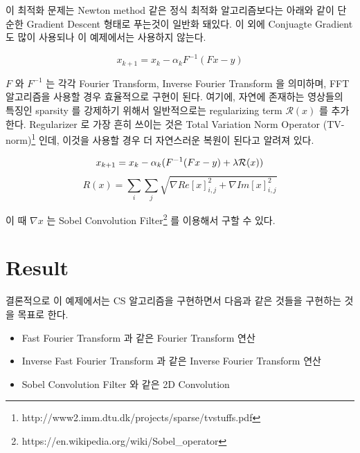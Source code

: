 \documentclass[twoside]{article}
\begin{document}
이 최적화 문제는 Newton method 같은 정식 최적화 알고리즘보다는 아래와 같이 단순한 Gradient Descent 형태로 푸는것이 일반화 돼있다. 이 외에 Conjuagte Gradient 도 많이 사용되나 이 예제에서는 사용하지 않는다.

\begin{equation}
  x_{k+1} = x_k - \alpha_k F^{-1} (Fx - y)
\end{equation}

$F$ 와 $F^{-1}$ 는 각각 Fourier Transform, Inverse Fourier Transform 을 의미하며, FFT 알고리즘을 사용할 경우 효율적으로 구현이 된다.
여기에, 자연에 존재하는 영상들의 특징인 sparsity 를 강제하기 위해서 일반적으로는 regularizing term $\mathcal{R}(x)$ 를 추가한다.
Regularizer 로 가장 흔히 쓰이는 것은 Total Variation Norm Operator (TV-norm)\footnote{http://www2.imm.dtu.dk/projects/sparse/tvstuffs.pdf} 인데, 이것을 사용할 경우 더 자연스러운 복원이 된다고 알려져 있다.

\begin{equation}
  x_{k+1} = x_k - \alpha_k (F^{-1} (Fx - y) + \lambda \mathcal{R}(x)) \\
\end{equation}
\begin{equation}
  R(x) = \sum_i \sum_j \sqrt{ \nabla Re{[x]}_{i,j}^2 + \nabla Im{[x]}_{i,j} ^2}
\end{equation}

이 때 $\nabla x$ 는 Sobel Convolution Filter\footnote{https://en.wikipedia.org/wiki/Sobel\_operator} 를 이용해서 구할 수 있다.

\section{Result}

결론적으로 이 예제에서는 CS 알고리즘을 구현하면서 다음과 같은 것들을 구현하는 것을 목표로 한다.
\begin{itemize}
  \item Fast Fourier Transform 과 같은 Fourier Transform 연산
  \item Inverse Fast Fourier Transform 과 같은 Inverse Fourier Transform 연산
  \item Sobel Convolution Filter 와 같은 2D Convolution
\end{itemize}
\end{document}

